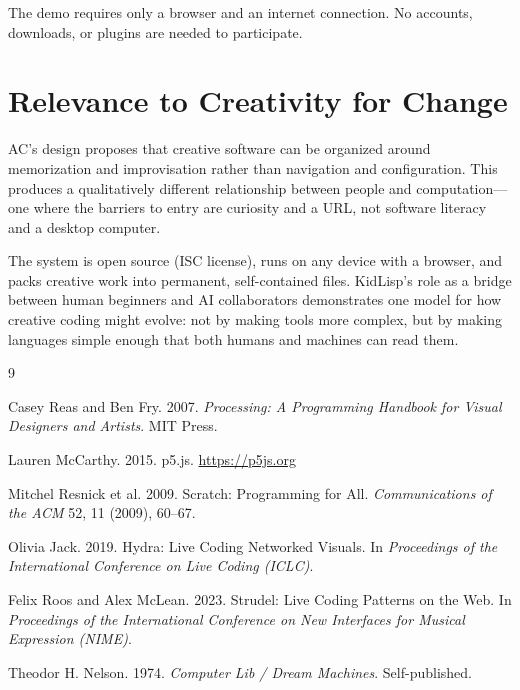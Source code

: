 \documentclass[manuscript,anonymous,review]{acmart}
\begin{document}
The demo requires only a browser and an internet connection. No accounts, downloads, or plugins are needed to participate.

\section{Relevance to Creativity for Change}

AC's design proposes that creative software can be organized around memorization and improvisation rather than navigation and configuration. This produces a qualitatively different relationship between people and computation---one where the barriers to entry are curiosity and a URL, not software literacy and a desktop computer.

The system is open source (ISC license), runs on any device with a browser, and packs creative work into permanent, self-contained files. KidLisp's role as a bridge between human beginners and AI collaborators demonstrates one model for how creative coding might evolve: not by making tools more complex, but by making languages simple enough that both humans and machines can read them.



\begin{thebibliography}{9}

Casey Reas and Ben Fry. 2007. \textit{Processing: A Programming Handbook for Visual Designers and Artists}. MIT Press.

Lauren McCarthy. 2015. p5.js. \url{https://p5js.org}

Mitchel Resnick et al. 2009. Scratch: Programming for All. \textit{Communications of the ACM} 52, 11 (2009), 60--67.

Olivia Jack. 2019. Hydra: Live Coding Networked Visuals. In \textit{Proceedings of the International Conference on Live Coding (ICLC)}.

Felix Roos and Alex McLean. 2023. Strudel: Live Coding Patterns on the Web. In \textit{Proceedings of the International Conference on New Interfaces for Musical Expression (NIME)}.

Theodor H. Nelson. 1974. \textit{Computer Lib / Dream Machines}. Self-published.

\end{thebibliography}
\end{document}
